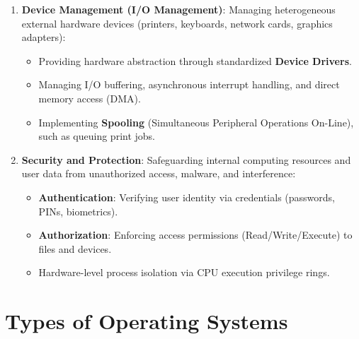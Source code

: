 \begin{enumerate}[leftmargin=1.5em]
    \item \textbf{Device Management (I/O Management)}:
    Managing heterogeneous external hardware devices (printers, keyboards, network cards, graphics adapters):
    \begin{itemize}
        \item Providing hardware abstraction through standardized \textbf{Device Drivers}.
        \item Managing I/O buffering, asynchronous interrupt handling, and direct memory access (DMA).
        \item Implementing \textbf{Spooling} (Simultaneous Peripheral Operations On-Line), such as queuing print jobs.
    \end{itemize}

    \item \textbf{Security and Protection}:
    Safeguarding internal computing resources and user data from unauthorized access, malware, and interference:
    \begin{itemize}
        \item \textbf{Authentication}: Verifying user identity via credentials (passwords, PINs, biometrics).
        \item \textbf{Authorization}: Enforcing access permissions (Read/Write/Execute) to files and devices.
        \item Hardware-level process isolation via CPU execution privilege rings.
    \end{itemize}
\end{enumerate}

\section{Types of Operating Systems}

